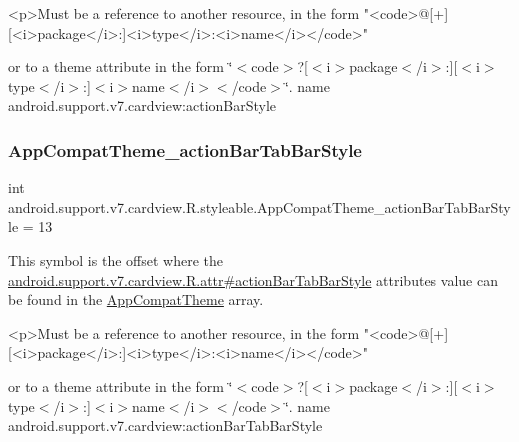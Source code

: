 \begin{DoxyVerb}      <p>Must be a reference to another resource, in the form "<code>@[+][<i>package</i>:]<i>type</i>:<i>name</i></code>"
\end{DoxyVerb}
 or to a theme attribute in the form \char`\"{}$<$code$>$?\mbox{[}$<$i$>$package$<$/i$>$\+:\mbox{]}\mbox{[}$<$i$>$type$<$/i$>$\+:\mbox{]}$<$i$>$name$<$/i$>$$<$/code$>$\char`\"{}.  name android.\+support.\+v7.\+cardview\+:action\+Bar\+Style \mbox{\label{classandroid_1_1support_1_1v7_1_1cardview_1_1R_1_1styleable_a62fc2bc35ec89e449e1937f9d5f64823}} 
\subsubsection{\texorpdfstring{App\+Compat\+Theme\+\_\+action\+Bar\+Tab\+Bar\+Style}{AppCompatTheme\_actionBarTabBarStyle}}
{\footnotesize\ttfamily int android.\+support.\+v7.\+cardview.\+R.\+styleable.\+App\+Compat\+Theme\+\_\+action\+Bar\+Tab\+Bar\+Style = 13\hspace{0.3cm}{\ttfamily [static]}}

This symbol is the offset where the \hyperlink{classandroid_1_1support_1_1v7_1_1cardview_1_1R_1_1attr_a6cec976666d0511a7c3d1e69ca2343e7}{android.\+support.\+v7.\+cardview.\+R.\+attr\#action\+Bar\+Tab\+Bar\+Style} attribute\textquotesingle{}s value can be found in the \hyperlink{classandroid_1_1support_1_1v7_1_1cardview_1_1R_1_1styleable_a52e6f69f954ecc2622d72c0b4d298938}{App\+Compat\+Theme} array.

\begin{DoxyVerb}      <p>Must be a reference to another resource, in the form "<code>@[+][<i>package</i>:]<i>type</i>:<i>name</i></code>"
\end{DoxyVerb}
 or to a theme attribute in the form \char`\"{}$<$code$>$?\mbox{[}$<$i$>$package$<$/i$>$\+:\mbox{]}\mbox{[}$<$i$>$type$<$/i$>$\+:\mbox{]}$<$i$>$name$<$/i$>$$<$/code$>$\char`\"{}.  name android.\+support.\+v7.\+cardview\+:action\+Bar\+Tab\+Bar\+Style \mbox{\label{classandroid_1_1support_1_1v7_1_1cardview_1_1R_1_1styleable_a05482cda1e27909ff5d3f7e056408426}} 
